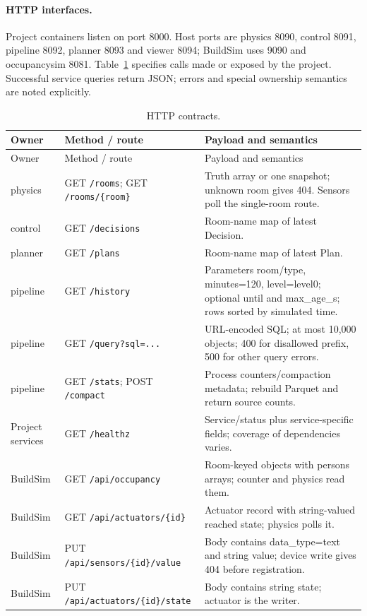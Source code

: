 \documentclass[11pt,a4paper]{article}
\begin{document}
\paragraph{HTTP interfaces.}
Project containers listen on port 8000. Host ports are physics 8090, control 8091, pipeline 8092, planner 8093 and viewer 8094; BuildSim uses 9090 and occupancysim 8081. Table~\ref{tab:http} specifies calls made or exposed by the project. Successful service queries return JSON; errors and special ownership semantics are noted explicitly.
{\small
\begin{longtable}{p{27mm}p{63mm}p{54mm}}
\caption{HTTP contracts.}\label{tab:http}\\\toprule Owner & Method / route & Payload and semantics\\\midrule\endfirsthead
\toprule Owner & Method / route & Payload and semantics\\\midrule\endhead
physics & GET \texttt{/rooms}; GET \texttt{/rooms/\{room\}} & Truth array or one snapshot; unknown room gives 404. Sensors poll the single-room route.\\
control & GET \texttt{/decisions} & Room-name map of latest Decision.\\
planner & GET \texttt{/plans} & Room-name map of latest Plan.\\
pipeline & GET \texttt{/history} & Parameters room/type, minutes=120, level=level0; optional until and max\_age\_s; rows sorted by simulated time.\\
pipeline & GET \texttt{/query?sql=...} & URL-encoded SQL; at most 10,000 objects; 400 for disallowed prefix, 500 for other query errors.\\
pipeline & GET \texttt{/stats}; POST \texttt{/compact} & Process counters/compaction metadata; rebuild Parquet and return source counts.\\
Project services & GET \texttt{/healthz} & Service/status plus service-specific fields; coverage of dependencies varies.\\
BuildSim & GET \texttt{/api/occupancy} & Room-keyed objects with persons arrays; counter and physics read them.\\
BuildSim & GET \texttt{/api/actuators/\{id\}} & Actuator record with string-valued reached state; physics polls it.\\
BuildSim & PUT \texttt{/api/sensors/\{id\}/value} & Body contains data\_type=text and string value; device write gives 404 before registration.\\
BuildSim & PUT \texttt{/api/actuators/\{id\}/state} & Body contains string state; actuator is the writer.\\

\end{longtable}}
\end{document}
